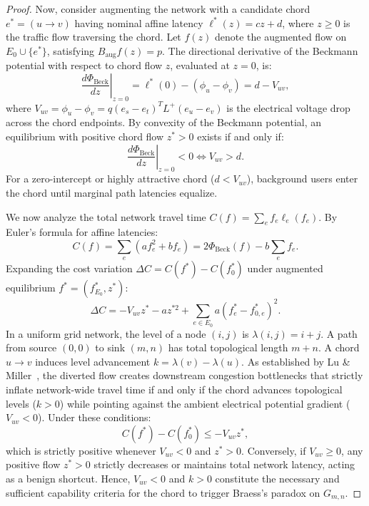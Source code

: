 \documentclass[11pt,a4paper]{article}
\begin{document}
\begin{proof}
Now, consider augmenting the network with a candidate chord $e^* = (u \to v)$ having nominal affine latency $\ell^*(z) = c z + d$, where $z \ge 0$ is the traffic flow traversing the chord. Let $f(z)$ denote the augmented flow on $E_0 \cup \{e^*\}$, satisfying $B_{\text{aug}} f(z) = p$. The directional derivative of the Beckmann potential with respect to chord flow $z$, evaluated at $z = 0$, is:
\begin{equation}
\left. \frac{d \Phi_{\text{Beck}}}{dz} \right|_{z=0} = \ell^*(0) - (\phi_u - \phi_v) = d - V_{uv},
\end{equation}
where $V_{uv} = \phi_u - \phi_v = q (e_s - e_t)^T L^+ (e_u - e_v)$ is the electrical voltage drop across the chord endpoints. By convexity of the Beckmann potential, an equilibrium with positive chord flow $z^* > 0$ exists if and only if:
\begin{equation}
\left. \frac{d \Phi_{\text{Beck}}}{dz} \right|_{z=0} < 0 \iff V_{uv} > d.
\end{equation}
For a zero-intercept or highly attractive chord ($d < V_{uv}$), background users enter the chord until marginal path latencies equalize.

We now analyze the total network travel time $C(f) = \sum_{e} f_e \ell_e(f_e)$. By Euler's formula for affine latencies:
\begin{equation}
C(f) = \sum_e (a f_e^2 + b f_e) = 2 \Phi_{\text{Beck}}(f) - b \sum_e f_e.
\end{equation}
Expanding the cost variation $\Delta C = C(f^*) - C(f_0^*)$ under augmented equilibrium $f^* = (f_{E_0}^*, z^*)$:
\begin{equation}
\Delta C = -V_{uv} z^* - a z^{*2} + \sum_{e \in E_0} a (f_e^* - f_{0, e}^*)^2.
\end{equation}
In a uniform grid network, the level of a node $(i, j)$ is $\lambda(i, j) = i + j$. A path from source $(0,0)$ to sink $(m, n)$ has total topological length $m + n$. A chord $u \to v$ induces level advancement $k = \lambda(v) - \lambda(u)$. As established by Lu \& Miller~\cite{lu2026braess}, the diverted flow creates downstream congestion bottlenecks that strictly inflate network-wide travel time if and only if the chord advances topological levels ($k > 0$) while pointing against the ambient electrical potential gradient ($V_{uv} < 0$). Under these conditions:
\begin{equation}
C(f^*) - C(f_0^*) \le -V_{uv} z^*,
\end{equation}
which is strictly positive whenever $V_{uv} < 0$ and $z^* > 0$. Conversely, if $V_{uv} \ge 0$, any positive flow $z^* > 0$ strictly decreases or maintains total network latency, acting as a benign shortcut. Hence, $V_{uv} < 0$ and $k > 0$ constitute the necessary and sufficient capability criteria for the chord to trigger Braess's paradox on $G_{m,n}$.
\end{proof}
\end{document}
